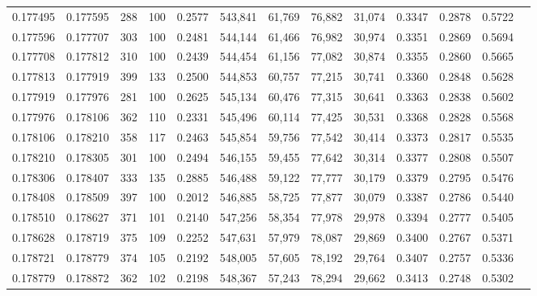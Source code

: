 \begin{tabular}{rrrrrrrrrrrrr}
0.177495 & 0.177595 &   288 & 100 &                                     0.2577 & 543,841 &  61,769 &  76,882 &  31,074 & 0.3347 & 0.2878 & 0.5722 \\
0.177596 & 0.177707 &   303 & 100 &                                     0.2481 & 544,144 &  61,466 &  76,982 &  30,974 & 0.3351 & 0.2869 & 0.5694 \\
0.177708 & 0.177812 &   310 & 100 &                                     0.2439 & 544,454 &  61,156 &  77,082 &  30,874 & 0.3355 & 0.2860 & 0.5665 \\
0.177813 & 0.177919 &   399 & 133 &                                     0.2500 & 544,853 &  60,757 &  77,215 &  30,741 & 0.3360 & 0.2848 & 0.5628 \\
0.177919 & 0.177976 &   281 & 100 &                                     0.2625 & 545,134 &  60,476 &  77,315 &  30,641 & 0.3363 & 0.2838 & 0.5602 \\
0.177976 & 0.178106 &   362 & 110 &                                     0.2331 & 545,496 &  60,114 &  77,425 &  30,531 & 0.3368 & 0.2828 & 0.5568 \\
0.178106 & 0.178210 &   358 & 117 &                                     0.2463 & 545,854 &  59,756 &  77,542 &  30,414 & 0.3373 & 0.2817 & 0.5535 \\
0.178210 & 0.178305 &   301 & 100 &                                     0.2494 & 546,155 &  59,455 &  77,642 &  30,314 & 0.3377 & 0.2808 & 0.5507 \\
0.178306 & 0.178407 &   333 & 135 &                                     0.2885 & 546,488 &  59,122 &  77,777 &  30,179 & 0.3379 & 0.2795 & 0.5476 \\
0.178408 & 0.178509 &   397 & 100 &                                     0.2012 & 546,885 &  58,725 &  77,877 &  30,079 & 0.3387 & 0.2786 & 0.5440 \\
0.178510 & 0.178627 &   371 & 101 &                                     0.2140 & 547,256 &  58,354 &  77,978 &  29,978 & 0.3394 & 0.2777 & 0.5405 \\
0.178628 & 0.178719 &   375 & 109 &                                     0.2252 & 547,631 &  57,979 &  78,087 &  29,869 & 0.3400 & 0.2767 & 0.5371 \\
0.178721 & 0.178779 &   374 & 105 &                                     0.2192 & 548,005 &  57,605 &  78,192 &  29,764 & 0.3407 & 0.2757 & 0.5336 \\
0.178779 & 0.178872 &   362 & 102 &                                     0.2198 & 548,367 &  57,243 &  78,294 &  29,662 & 0.3413 & 0.2748 & 0.5302 \\

\end{tabular}
